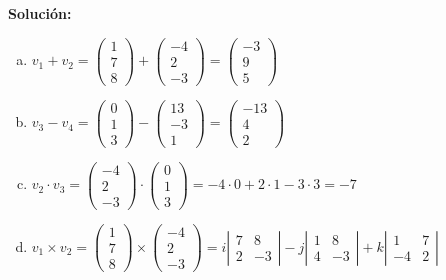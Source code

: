 \documentclass[12pt]{article}
\newenvironment{solucion}
{\begin{mdframed}[backgroundcolor=black!10]
		{\bf Solución:}\\
	}
	{
	\end{mdframed}
}
\newenvironment{preguntas}
{\begin{enumerate}\itemsep12pt
	}
	{
	\end{enumerate}
}
\begin{document}
\begin{preguntas}
\begin{solucion}
\begin{enumerate}[a)]
\item  $v_1 + v_2 =\begin{pmatrix}
				1\\
				7\\
				8
				\end{pmatrix} + \begin{pmatrix}
				-4\\
				2\\
				-3
				\end{pmatrix} = \begin{pmatrix}
				-3\\
				9\\
				5
				\end{pmatrix}$
\item $v_3 - v_4 = \begin{pmatrix}
				0\\
				1\\
				3
				\end{pmatrix} - \begin{pmatrix}
				13\\
				-3\\
				1
				\end{pmatrix} =  \begin{pmatrix}
				-13\\
				4\\
				2
				\end{pmatrix}$
\item $v_2 \cdot v_3 = \begin{pmatrix}
				-4\\
				2\\
				-3
				\end{pmatrix} \cdot \begin{pmatrix}
				0\\
				1\\
				3
				\end{pmatrix} = -4 \cdot 0 + 2 \cdot 1 -3 \cdot 3 = -7$
\item $v_1 \times v_2 = \begin{pmatrix}
				1\\
				7\\
				8
			\end{pmatrix} \times \begin{pmatrix}
				-4\\
				2\\
				-3
			\end{pmatrix} = i \left| \begin{matrix} 7 & 8 \\ 2 & -3\end{matrix} \right| - j \left| \begin{matrix} 1 & 8 \\ 4 & -3\end{matrix} \right| + k \left| \begin{matrix} 1 & 7 \\ -4 & 2\end{matrix} \right|$\\

\end{enumerate}
\end{solucion}
\end{preguntas}
\end{document}
